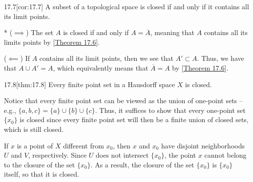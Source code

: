 \begin{thmBox}[Corollary]{17.7}[cor:17.7]
    A subset of a topological space is closed if and only if it contains all its limit points. 

    \baseRule

    \begin{proofBox}*
        (\( \implies \))
        The set \( A \) is closed if and only if \( A = \overline{ A } \), 
        meaning that \( A \) contains all its limits points by 
        [\hyperlink{thm:17.6}{Theorem 17.6}].

        \baseSkip 

        (\( \impliedby \))
        If \( A \) contains all its limit points, then we see that 
        \( A' \subset A \). 
        Thus, we have that \( A \cup A' = A \), which equivalently means that 
        \( \overline{ A } = A \) by [\hyperlink{thm:17.6}{Theorem 17.6}].
    \end{proofBox}
\end{thmBox}

\begin{thmBox}{17.8}[thm:17.8]
    Every finite point set in a Hausdorff space \( X \) is closed.

    \baseRule

    \begin{proofBox}
        Notice that every finite point set can be viewed as the union of 
        one-point sets -- e.g., \( \{ a, b, c \} = \{ a \} \cup \{ b \} \cup 
        \{ c \} \). 
        Thus, it suffices to show that every one-point set \( \{ x_{ 0 } \} \)
        is closed since every finite point set will then be a finite union 
        of closed sets, which is still closed.

        \baseSkip

        If \( x \) is a point of \( X \) different from \( x_{ 0 } \), then 
        \( x \) and \( x_{ 0 } \) have disjoint neighborhoods \( U \) and 
        \( V \), respectively.
        Since \( U \) does not intersect \( \{ x_{ 0 } \} \), the point \( x \)
        cannot belong to the closure of the set \( \{ x_{ 0 } \} \).
        As a result, the closure of the set \( \{ x_{ 0 } \} \) is 
        \( \{ x_{ 0 } \} \) itself, so that it is closed.
    \end{proofBox}
\end{thmBox}

